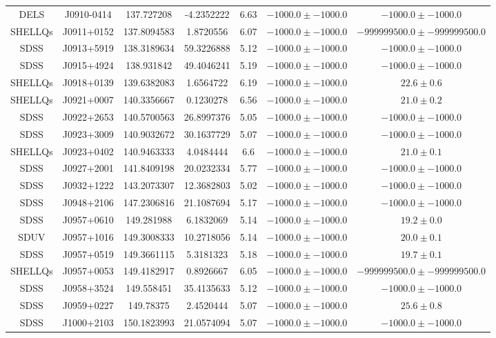 \begin{table}
\begin{tabular}{ccccccc}
DELS & J0910-0414 & 137.727208 & -4.2352222 & 6.63 & $-1000.0\pm-1000.0$ & $-1000.0\pm-1000.0$ \\
SHELLQs & J0911+0152 & 137.8094583 & 1.8720556 & 6.07 & $-1000.0\pm-1000.0$ & $-999999500.0\pm-999999500.0$ \\
SDSS & J0913+5919 & 138.3189634 & 59.3226888 & 5.12 & $-1000.0\pm-1000.0$ & $-1000.0\pm-1000.0$ \\
SDSS & J0915+4924 & 138.931842 & 49.4046241 & 5.19 & $-1000.0\pm-1000.0$ & $-1000.0\pm-1000.0$ \\
SHELLQs & J0918+0139 & 139.6382083 & 1.6564722 & 6.19 & $-1000.0\pm-1000.0$ & $  22.6\pm  0.6$ \\
SHELLQs & J0921+0007 & 140.3356667 & 0.1230278 & 6.56 & $-1000.0\pm-1000.0$ & $  21.0\pm  0.2$ \\
SDSS & J0922+2653 & 140.5700563 & 26.8997376 & 5.05 & $-1000.0\pm-1000.0$ & $-1000.0\pm-1000.0$ \\
SDSS & J0923+3009 & 140.9032672 & 30.1637729 & 5.07 & $-1000.0\pm-1000.0$ & $-1000.0\pm-1000.0$ \\
SHELLQs & J0923+0402 & 140.9463333 & 4.0484444 & 6.6 & $-1000.0\pm-1000.0$ & $  21.0\pm  0.1$ \\
SDSS & J0927+2001 & 141.8409198 & 20.0232334 & 5.77 & $-1000.0\pm-1000.0$ & $-1000.0\pm-1000.0$ \\
SDSS & J0932+1222 & 143.2073307 & 12.3682803 & 5.02 & $-1000.0\pm-1000.0$ & $-1000.0\pm-1000.0$ \\
SDSS & J0948+2106 & 147.2306816 & 21.1087694 & 5.17 & $-1000.0\pm-1000.0$ & $-1000.0\pm-1000.0$ \\
SDSS & J0957+0610 & 149.281988 & 6.1832069 & 5.14 & $-1000.0\pm-1000.0$ & $  19.2\pm  0.0$ \\
SDUV & J0957+1016 & 149.3008333 & 10.2718056 & 5.14 & $-1000.0\pm-1000.0$ & $  20.0\pm  0.1$ \\
SDSS & J0957+0519 & 149.3661115 & 5.3181323 & 5.18 & $-1000.0\pm-1000.0$ & $  19.7\pm  0.1$ \\
SHELLQs & J0957+0053 & 149.4182917 & 0.8926667 & 6.05 & $-1000.0\pm-1000.0$ & $-999999500.0\pm-999999500.0$ \\
SDSS & J0958+3524 & 149.558451 & 35.4135633 & 5.12 & $-1000.0\pm-1000.0$ & $-1000.0\pm-1000.0$ \\
SDSS & J0959+0227 & 149.78375 & 2.4520444 & 5.07 & $-1000.0\pm-1000.0$ & $  25.6\pm  0.8$ \\
SDSS & J1000+2103 & 150.1823993 & 21.0574094 & 5.07 & $-1000.0\pm-1000.0$ & $-1000.0\pm-1000.0$ \\

\end{tabular}
\end{table}
